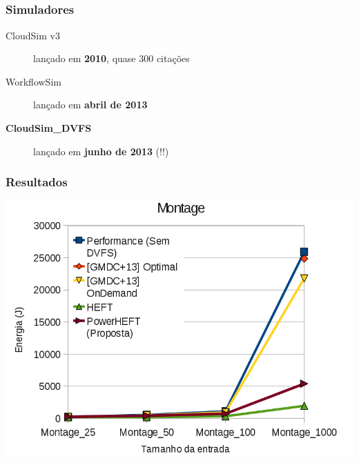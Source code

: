 \documentclass{beamer}
\newcommand{\colorize}[2]{\textbf{\textcolor{#1}{#2}}}
\begin{document}
\subsection{}


\begin{frame}
\frametitle{Simuladores}
\begin{description}
	\item[CloudSim v3] lançado em \colorize{n_violet}{2010}, quase 300 citações
	\item[WorkflowSim] lançado em \colorize{n_green}{abril de 2013}
	\item[\textbf{CloudSim\_DVFS}] lançado em \colorize{n_red}{junho de 2013} (!!)
\end{description}

\end{frame}

\begin{frame}
\frametitle{Resultados}
	\begin{center}
		\includegraphics[width=0.9\columnwidth]{Montage.png}
	\end{center}
\end{frame}
\end{document}
